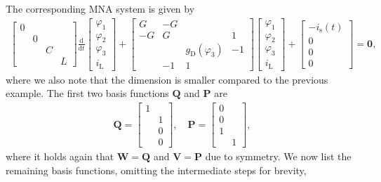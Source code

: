 \documentclass[AMA,STIX1COL]{WileyNJD-v2}
\newcommand{\mb}[1]{\mathbf{#1}}
\newcommand{\mr}[1]{\mathrm{#1}}
\newcommand{\ddt}{\frac{\mathrm{d}}{\mathrm{d}t}}
\begin{document}
The corresponding MNA system is given by
\begin{align*}
    \begin{bmatrix}
        0 & & &\\
        & 0 & &\\
        & & C &\\
        & & & L
    \end{bmatrix} \ddt \begin{bmatrix}
        \varphi_1\\
        \varphi_2\\
        \varphi_3\\
        i_\mr{L}
    \end{bmatrix} + \begin{bmatrix}
        G & -G & &\\
        -G & G & & 1\\
        & & g_\mr{D}(\varphi_3) & -1\\
        & -1 & 1 &
    \end{bmatrix} \begin{bmatrix}
        \varphi_1\\
        \varphi_2\\
        \varphi_3\\
        i_\mr{L}
    \end{bmatrix} + \begin{bmatrix}
        -i_\mr{s}(t)\\
        0\\
        0\\
        0
    \end{bmatrix} = \mb{0},
\end{align*}
where we also note that the dimension is smaller compared to the previous example. The first two basis functions $\mb{Q}$ and $\mb{P}$ are
\begin{align*}
    \mb{Q} = \begin{bmatrix}
        1 &\\
        & 1\\
        & 0\\
        & 0
    \end{bmatrix}, \quad \mb{P} = \begin{bmatrix}
        0 &\\
        0 &\\
        1 &\\
        & 1
    \end{bmatrix},
\end{align*}
where it holds again that $\mb{W} = \mb{Q}$ and $\mb{V} = \mb{P}$ due to symmetry. We now list the remaining basis functions, omitting the intermediate steps for brevity,
\end{document}
